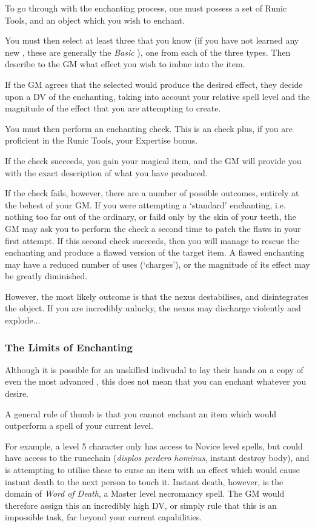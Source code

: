 To go through with the enchanting process, one must possess a set of Runic Tools, and an object which you wish to enchant. 

You must then select at least three  that you know (if you have not learned any new , these are generally the {\it Basic }), one from each of the three types. Then describe to the GM what effect you wish to imbue into the item. 

If the GM agrees that the selected  would produce the desired effect, they decide upon a DV of the enchanting, taking into account your relative spell level and the magnitude of the effect that you are attempting to create. 

You must then perform an enchanting check. This is an \attFin{} check plus, if you are proficient in the Runic Tools, your Expertise bonus. 

If the check succeeds, you gain your magical item, and the GM will provide you with the exact description of what you have produced. 

If the check fails, however, there are a number of possible outcomes, entirely at the behest of your GM. If you were attempting a `standard' enchanting, i.e. nothing too far out of the ordinary, or faild only by the skin of your teeth, the GM may ask you to perform the check a second time to patch the flaws in your first attempt. If this second check succeeds, then you will manage to rescue the enchanting and produce a flawed version of the target item. A flawed enchanting may have a reduced number of uses (`charges'), or the magnitude of its effect may be greatly diminished. 

However, the most likely outcome is that the nexus destabilises, and disintegrates the object. If you are incredibly unlucky, the nexus may discharge violently and explode...

\subsubsection{The Limits of Enchanting}

Although it is possible for an unskilled indivudal to lay their hands on a copy of even the most advanced , this does not mean that you can enchant whatever you desire. 

A general rule of thumb is that you cannot enchant an item which would outperform a spell of your current level. 

For example, a level 5 character only has access to Novice level spells, but could have access to the runechain \rune{\displos\perdero\hominus} ({\it displos perdero hominus}, instant destroy body), and is attempting to utilise these  to curse an item with an effect which would cause instant death to the next person to touch it. Instant death, however, is the domain of {\it Word of Death}, a Master level necromancy spell. The GM would therefore assign this an incredibly high DV, or simply rule that this is an impossible task, far beyond your current capabilities. 

